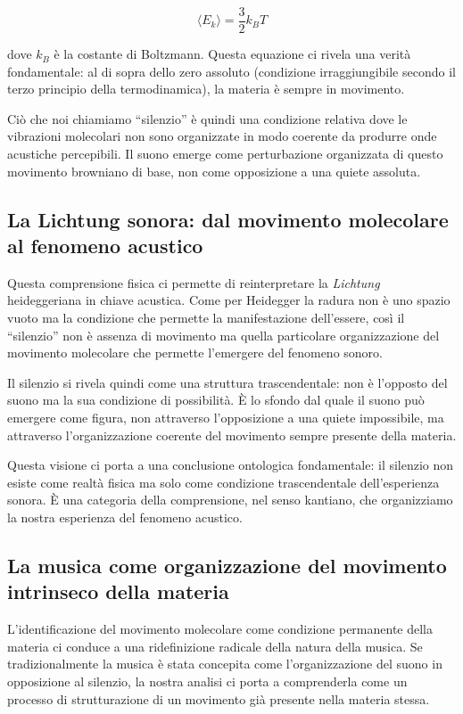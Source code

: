 \documentclass{gs-adonis}
\begin{document}
\[\langle E_k \rangle = \frac{3}{2}k_BT\]

dove \(k_B\) è la costante di Boltzmann. Questa equazione ci rivela una
verità fondamentale: al di sopra dello zero assoluto (condizione
irraggiungibile secondo il terzo principio della termodinamica), la
materia è sempre in movimento.

Ciò che noi chiamiamo ``silenzio'' è quindi una condizione relativa dove
le vibrazioni molecolari non sono organizzate in modo coerente da
produrre onde acustiche percepibili. Il suono emerge come perturbazione
organizzata di questo movimento browniano di base, non come opposizione
a una quiete assoluta.

\subsection{La Lichtung sonora: dal movimento molecolare al fenomeno
acustico}\label{la-lichtung-sonora-dal-movimento-molecolare-al-fenomeno-acustico}

Questa comprensione fisica ci permette di reinterpretare la
\emph{Lichtung} heideggeriana in chiave acustica. Come per Heidegger la
radura non è uno spazio vuoto ma la condizione che permette la
manifestazione dell'essere, così il ``silenzio'' non è assenza di
movimento ma quella particolare organizzazione del movimento molecolare
che permette l'emergere del fenomeno sonoro.

Il silenzio si rivela quindi come una struttura trascendentale: non è
l'opposto del suono ma la sua condizione di possibilità. È lo sfondo dal
quale il suono può emergere come figura, non attraverso l'opposizione a
una quiete impossibile, ma attraverso l'organizzazione coerente del
movimento sempre presente della materia.

Questa visione ci porta a una conclusione ontologica fondamentale: il
silenzio non esiste come realtà fisica ma solo come condizione
trascendentale dell'esperienza sonora. È una categoria della
comprensione, nel senso kantiano, che organizziamo la nostra esperienza
del fenomeno acustico.

\subsection{La musica come organizzazione del movimento intrinseco della
materia}\label{la-musica-come-organizzazione-del-movimento-intrinseco-della-materia}

L'identificazione del movimento molecolare come condizione permanente
della materia ci conduce a una ridefinizione radicale della natura della
musica. Se tradizionalmente la musica è stata concepita come
l'organizzazione del suono in opposizione al silenzio, la nostra analisi
ci porta a comprenderla come un processo di strutturazione di un
movimento già presente nella materia stessa.
\end{document}
